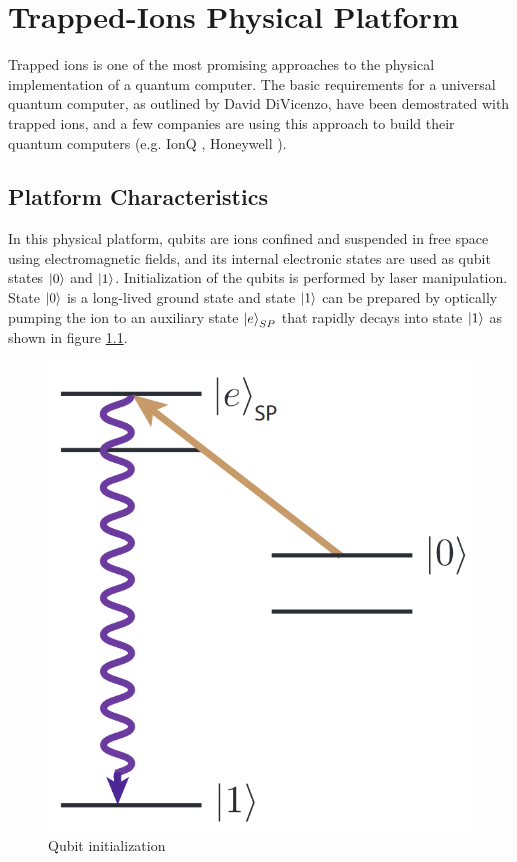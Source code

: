 %
%
\chapter {Trapped-Ions Physical Platform}

Trapped ions is one of the most promising approaches to the physical implementation of a quantum computer\cite{TrappedIonQuantumComputing_2019}. The basic requirements for a universal quantum computer, as outlined by David DiVicenzo\cite{ThePhysicalImplementationOfQuantumComputation_DiVicenzo_2000}, have been demostrated with trapped ions, and a few companies are using this approach to build their quantum computers (e.g. IonQ \cite{IonQTechnology}, Honeywell \cite{HoneywellSystemModelH1}).

\section{Platform Characteristics}

In this physical platform, qubits are ions confined and suspended in free space using electromagnetic fields, and its internal electronic states are used as qubit states $\left|{0}\right\rangle$ and $\left|{1}\right\rangle$. Initialization of the qubits is performed by laser manipulation. State $\left|{0}\right\rangle$ is a long-lived ground state and state $\left|{1}\right\rangle$ can be prepared by optically pumping the ion to an auxiliary state $\left|{e}\right\rangle_{SP}$ that rapidly decays into state $\left|{1}\right\rangle$ as shown in figure \ref{fig:QubitInitialization}.

\begin{figure}[h!]
    \centering
    \includegraphics[scale=.30]{images/TrappedIons-StatePreparation.png}
    \caption{Qubit initialization \cite{TrappedIonQuantumComputing_2019}}
    \label{fig:QubitInitialization}
\end{figure}

